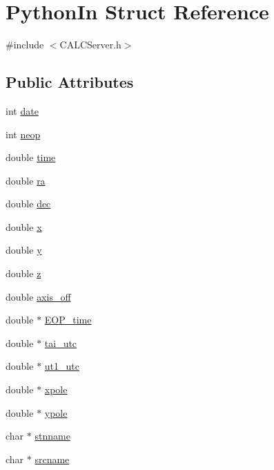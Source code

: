 \hypertarget{struct_python_in}{}\section{Python\+In Struct Reference}
\label{struct_python_in}


{\ttfamily \#include $<$C\+A\+L\+C\+Server.\+h$>$}

\subsection*{Public Attributes}
\begin{DoxyCompactItemize}
\item 
int \hyperlink{struct_python_in_add11f2b1d4e33b43e513d19348eb7d9e}{date}
\item 
int \hyperlink{struct_python_in_a4acfd5268f99a241fa78115e7fdedf37}{neop}
\item 
double \hyperlink{struct_python_in_a413347f9cb1e54604415376b0760ca59}{time}
\item 
double \hyperlink{struct_python_in_a156e0b7dd55afb31b9f80be79f1ffc6c}{ra}
\item 
double \hyperlink{struct_python_in_a92814fe3321bbc5e4162424fb67dcccd}{dec}
\item 
double \hyperlink{struct_python_in_acffa2c5e1d28931e7766098deb947f55}{x}
\item 
double \hyperlink{struct_python_in_a773ae302158d868fc98958aa9b0671d1}{y}
\item 
double \hyperlink{struct_python_in_a766ef6c8019ae380824fdbeb38809cc2}{z}
\item 
double \hyperlink{struct_python_in_abe56c6bc95dd8aa5a0b0ef6d48f9de13}{axis\+\_\+off}
\item 
double $\ast$ \hyperlink{struct_python_in_a497f34dbe6fa656e9bc4b46b1c88d17e}{E\+O\+P\+\_\+time}
\item 
double $\ast$ \hyperlink{struct_python_in_a1842e57fb5cec904f398ad5c3affe267}{tai\+\_\+utc}
\item 
double $\ast$ \hyperlink{struct_python_in_a8d59549eb346267d7607de08fc25d79f}{ut1\+\_\+utc}
\item 
double $\ast$ \hyperlink{struct_python_in_a8e83e7f449767dad0d58df06a0511e76}{xpole}
\item 
double $\ast$ \hyperlink{struct_python_in_a0ba3a0a96e4a050c9e02cbe497f065c3}{ypole}
\item 
char $\ast$ \hyperlink{struct_python_in_a0e1b4ee89ed431b9b4a16ca15d7cb8fd}{stnname}
\item 
char $\ast$ \hyperlink{struct_python_in_a5740cfc97368f1f82d4f2a6c3b8eb22b}{srcname}
\end{DoxyCompactItemize}


